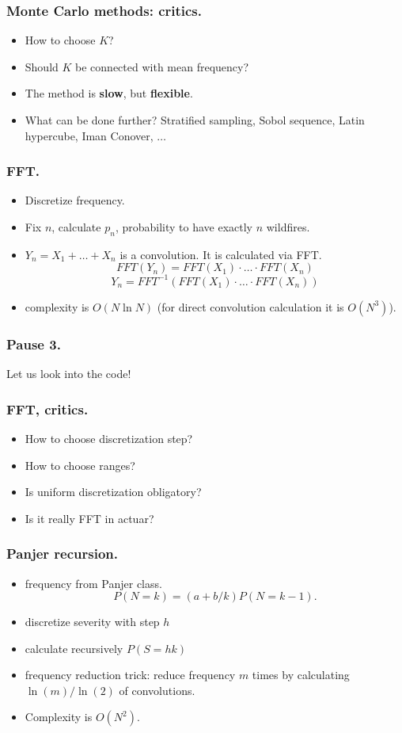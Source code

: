 \documentclass{beamer}
\begin{document}
\begin{frame}[fragile]
\frametitle{Monte Carlo methods: critics.}
\begin{itemize}
	\item How to choose $K$?
	\item Should $K$ be connected with mean frequency?
	\item The method is \textbf{slow}, but \textbf{flexible}.
	\item What can be done further? Stratified sampling, Sobol sequence, Latin hypercube, Iman Conover, $\ldots$
\end{itemize}
\end{frame}
\begin{frame}[fragile]
\frametitle{FFT.}
\begin{itemize}
\item Discretize frequency.
\item Fix $n$, calculate $p_n$, probability to have exactly $n$ wildfires.
\item $Y_n = X_1 + \ldots + X_n$ is a convolution.
It is calculated via FFT.
$$FFT(Y_n) = FFT(X_1)\cdot\ldots\cdot FFT(X_n)$$
$$Y_n = FFT^{-1}(FFT(X_1)\cdot\ldots\cdot FFT(X_n))$$
\item complexity is $O(N\ln N)$ (for direct convolution calculation it is $O(N^3)$).
\end{itemize}
\end{frame}
\begin{frame}[fragile]
\frametitle{Pause 3.}
\begin{center}
Let us look into the code!
\end{center}
\end{frame}
\begin{frame}[fragile]
\frametitle{FFT, critics.}
\begin{itemize}
\item How to choose discretization step?
\item How to choose ranges?
\item Is uniform discretization obligatory?
\item Is it really FFT in actuar?
\end{itemize}
\end{frame}
\begin{frame}[fragile]
\frametitle{Panjer recursion.}
\begin{itemize}
\item frequency from Panjer class.
 $$P(N = k) = (a+b/k)P(N = k-1).$$
\item discretize severity with step $h$
\item calculate recursively $P(S = hk)$
\item frequency reduction trick: reduce frequency $m$ times by calculating $\ln(m)/\ln(2)$ of convolutions.
\item Complexity is $O(N^2)$.
\end{itemize}
\end{frame}
\end{document}
